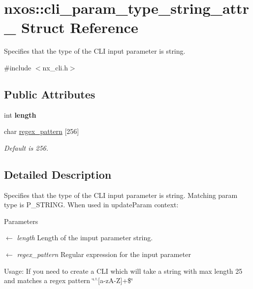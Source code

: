 \hypertarget{structnxos_1_1cli__param__type__string__attr__}{
\section{nxos::cli\_\-param\_\-type\_\-string\_\-attr\_\- Struct Reference}
\label{structnxos_1_1cli__param__type__string__attr__}
}


Specifies that the type of the CLI input parameter is string.  


{\ttfamily \#include $<$nx\_\-cli.h$>$}\subsection*{Public Attributes}
\begin{DoxyCompactItemize}
\item 
\hypertarget{structnxos_1_1cli__param__type__string__attr___a7d79d5555be5655287949d7830bd876c}{
int {\bfseries length}}
\label{structnxos_1_1cli__param__type__string__attr___a7d79d5555be5655287949d7830bd876c}

\item 
\hypertarget{structnxos_1_1cli__param__type__string__attr___a2a547a1318e243011f100535aebf0a49}{
char \hyperlink{structnxos_1_1cli__param__type__string__attr___a2a547a1318e243011f100535aebf0a49}{regex\_\-pattern} \mbox{[}256\mbox{]}}
\label{structnxos_1_1cli__param__type__string__attr___a2a547a1318e243011f100535aebf0a49}

\begin{DoxyCompactList}\small\item\em Default is 256. \item\end{DoxyCompactList}\end{DoxyCompactItemize}


\subsection{Detailed Description}
Specifies that the type of the CLI input parameter is string. Matching param type is P\_\-STRING. When used in updateParam context: 
\begin{DoxyParams}{Parameters}
\item[\mbox{$\leftarrow$} {\em length}]Length of the imput parameter string. \item[\mbox{$\leftarrow$} {\em regex\_\-pattern}]Regular expression for the input parameter\end{DoxyParams}
Usage: If you need to create a CLI which will take a string with max length 25 and matches a regex pattern \char`\"{}$^\wedge$\mbox{[}a-\/zA-\/Z\mbox{]}+\$\char`\"{}

